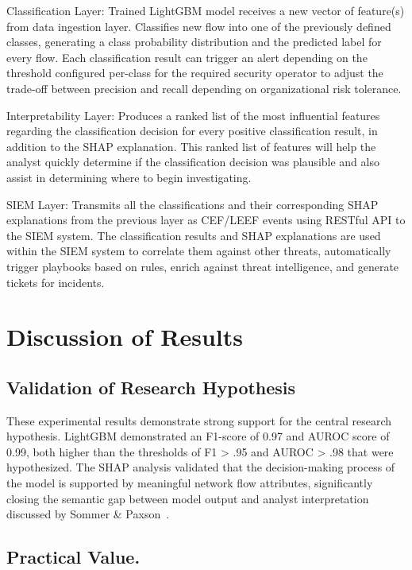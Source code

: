 Classification Layer: Trained LightGBM model receives a new vector of feature(s) from data ingestion layer. Classifies new flow into one of the previously defined classes, generating a class probability distribution and the predicted label for every flow. Each classification result can trigger an alert depending on the threshold configured per-class for the required security operator to adjust the trade-off between precision and recall depending on organizational risk tolerance.

Interpretability Layer: Produces a ranked list of the most influential features regarding the classification decision for every positive classification result, in addition to the SHAP explanation. This ranked list of features will help the analyst quickly determine if the classification decision was plausible and also assist in determining where to begin investigating.

SIEM Layer: Transmits all the classifications and their corresponding SHAP explanations from the previous layer as CEF/LEEF events using RESTful API to the SIEM system. The classification results and SHAP explanations are used within the SIEM system to correlate them against other threats, automatically trigger playbooks based on rules, enrich against threat intelligence, and generate tickets for incidents.

\section{Discussion of Results}

\subsection{Validation of Research Hypothesis}

These experimental results demonstrate strong support for the central research hypothesis. LightGBM demonstrated an F1-score of 0.97 and AUROC score of 0.99, both higher than the thresholds of F1 > .95 and AUROC > .98 that were hypothesized. The SHAP analysis validated that the decision-making process of the model is supported by meaningful network flow attributes, significantly closing the semantic gap between model output and analyst interpretation discussed by Sommer & Paxson~\cite{sommer2010outside}.

\subsection{Practical Value. }

